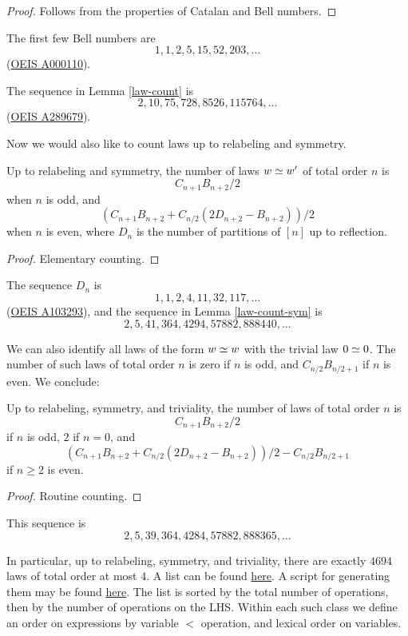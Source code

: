 \begin{proof} Follows from the properties of Catalan and Bell numbers.
\end{proof}

The first few Bell numbers are
$$ 1, 1, 2, 5, 15, 52, 203, \dots$$
(\href{https://oeis.org/A000110}{OEIS A000110}).

The sequence in Lemma \ref{law-count} is
$$ 2, 10, 75, 728, 8526, 115764, \dots$$
(\href{https://oeis.org/A289679}{OEIS A289679}).

Now we would also like to count laws up to relabeling and symmetry.

\begin{lemma}\label{law-count-sym} Up to relabeling and symmetry, the number of laws $w \simeq w'$ of total order $n$ is
$$ C_{n+1} B_{n+2}/2$$
when $n$ is odd, and
$$ (C_{n+1} B_{n+2} + C_{n/2} (2D_{n+2} - B_{n+2}))/2$$
when $n$ is even, where $D_n$ is the number of partitions of $[n]$ up to reflection.
\end{lemma}

\begin{proof} Elementary counting.
\end{proof}

The sequence $D_n$ is
$$ 1, 1, 2, 4, 11, 32, 117, \dots$$
(\href{https://oeis.org/A103293}{OEIS A103293}), and the sequence in Lemma \ref{law-count-sym} is 
$$ 2, 5, 41, 364, 4294, 57882, 888440, \dots$$

We can also identify all laws of the form $w \simeq w$ with the trivial law $0 \simeq 0$.  The number of such laws of total order $n$ is zero if $n$ is odd, and $C_{n/2} B_{n/2+1}$ if $n$ is even.  We conclude:

\begin{lemma}  Up to relabeling, symmetry, and triviality, the number of laws of total order $n$ is
$$ C_{n+1} B_{n+2}/2$$
if $n$ is odd, $2$ if $n = 0$, and
$$ (C_{n+1} B_{n+2} + C_{n/2} (2D_{n+2} - B_{n+2}))/2 - C_{n/2} B_{n/2+1}$$
if $n \geq 2$ is even.
\end{lemma}

\begin{proof} Routine counting.
\end{proof}

This sequence is
$$2, 5, 39, 364, 4284, 57882, 888365, \dots$$

In particular, up to relabeling, symmetry, and triviality, there are exactly $4694$ laws of total order at most $4$.  A list can be found \href{https://github.com/teorth/equational_theories/blob/main/data/equations.txt}{here}.  A script for generating them may be found \href{https://github.com/teorth/equational_theories/blob/main/scripts/generate_eqs_list.py}{here}.  The list is sorted by the total number of operations, then by the number of operations on the LHS. Within each such class we define an order on expressions by variable $<$ operation, and lexical order on variables.
